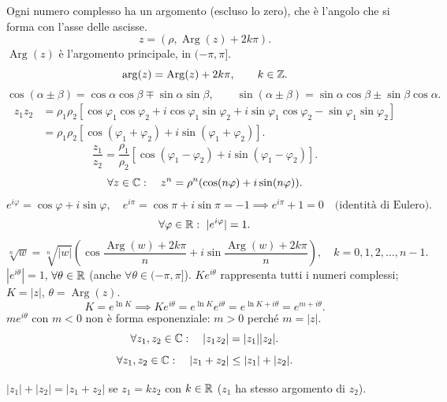 Ogni numero complesso ha un argomento (escluso lo zero), che è l'angolo che si forma con l'asse delle ascisse.
\[z=(\rho,\operatorname{Arg}(z)+2k\pi).\]
$\operatorname{Arg}(z)$ è l'argomento principale, in $(-\pi,\pi]$.
\[\arg(z)=\operatorname{Arg}(z)+2k\pi,\qquad k\in\mathbb Z.\]
\[\cos(\alpha\pm\beta)=\cos\alpha\cos\beta\mp\sin\alpha\sin\beta,\qquad
\sin(\alpha\pm\beta)=\sin\alpha\cos\beta\pm\sin\beta\cos\alpha.\]
\begin{align*}z_1z_2&=\rho_1\rho_2[\cos\varphi_1\cos\varphi_2+i\cos\varphi_1\sin\varphi_2+i\sin\varphi_1\cos\varphi_2-\sin\varphi_1\sin\varphi_2]\\
&=\rho_1\rho_2[\cos(\varphi_1+\varphi_2)+i\sin(\varphi_1+\varphi_2)].\end{align*}
\[\frac{z_1}{z_2}=\frac{\rho_1}{\rho_2}[\cos(\varphi_1-\varphi_2)+i\sin(\varphi_1-\varphi_2)].\]
\[\forall z\in\mathbb C:\quad z^n=\rho^n(\cos(n\varphi)+i\sin(n\varphi)).\]
\[e^{i\varphi}=\cos\varphi+i\sin\varphi,\quad e^{i\pi}=\cos\pi+i\sin\pi=-1\implies\boxed{e^{i\pi}+1=0}\quad\text{(identità di Eulero)}.\]
\[\forall\varphi\in\R:\ |e^{i\varphi}|=1.\]
\[\sqrt[n]{w}=\sqrt[n]{|w|}\left(\cos\frac{\operatorname{Arg}(w)+2k\pi}{n}+i\sin\frac{\operatorname{Arg}(w)+2k\pi}{n}\right),\quad k=0,1,2,\ldots,n-1.\]
$|e^{i\theta}|=1$, $\forall\theta\in\mathbb R$ (anche $\forall\theta\in(-\pi,\pi]$).
$Ke^{i\theta}$ rappresenta tutti i numeri complessi; $K=|z|$, $\theta=\operatorname{Arg}(z)$.
\[K=e^{\ln K}\implies Ke^{i\theta}=e^{\ln K}e^{i\theta}=e^{\ln K+i\theta}=e^{m+i\theta}.\]
$me^{i\theta}$ con $m<0$ non è forma esponenziale: $m>0$ perché $m=|z|$.
\[\forall z_1,z_2\in\mathbb C:\quad |z_1z_2|=|z_1||z_2|.\]
\[\forall z_1,z_2\in\mathbb C:\quad |z_1+z_2|\le |z_1|+|z_2|.\]
\begin{center}\end{center}
$|z_1|+|z_2|=|z_1+z_2|$ se $z_1=kz_2$ con $k\in\mathbb R$ ($z_1$ ha stesso argomento di $z_2$).
